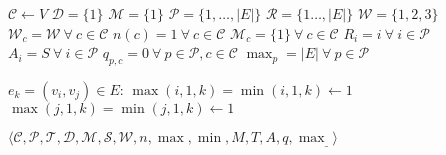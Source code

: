 \begin{codebox}
\li $\mathcal{C} \gets V$
\li $\mathcal{D} = \{1\}$
\li $\mathcal{M} = \{1\}$
\li $\mathcal{P} = \{1, \dots, |E|\}$
\li $\mathcal{R} = \{1 \dots, |E|\}$
\li $\mathcal{W} = \{1, 2, 3\}$
\li $\mathcal{W}_c = \mathcal{W}\ \forall\ c \in \mathcal{C}$
\li $n(c) = 1\ \forall\ c \in \mathcal{C}$
\li $\mathcal{M}_c = \{1\}\ \forall\ c \in \mathcal{C}$
\li $R_i = i\ \forall\ i \in \mathcal{P}$
\li $A_i = S\ \forall\ i \in \mathcal{P}$
\li $q_{p, c} = 0\ \forall\ p \in \mathcal{P}, c \in \mathcal{C}$
\li $\max_p = |E|\ \forall\ p \in \mathcal{P}$

\li \For $e_k = (v_i, v_j) \in E$:
\li \Do $\max(i, 1, k) = \min(i, 1, k) \gets 1$
\li     $\max(j, 1, k) = \min(j, 1, k) \gets 1$
    \End

    \li \Return $\langle \mathcal{C}, \mathcal{P}, \mathcal{T}, \mathcal{D}, \mathcal{M}, \mathcal{S}, \mathcal{W}, n, \max, \min, M, T, A, q, \max_{\_} \rangle$
\end{codebox}
